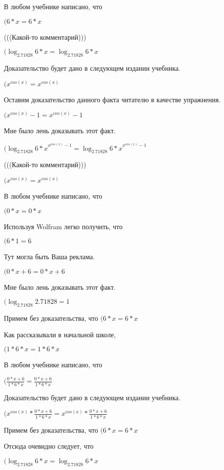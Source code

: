 \documentclass[12pt,a4paper,fleqn]{article}
\theoremstyle{definition}
\begin{document}
В любом учебнике написано, что

$( 6  *  x  =  6  *  x $

(((Какой-то комментарий)))

$(\log_{ 2.71828 }{ 6  *  x } = \log_{ 2.71828 }{ 6  *  x }$

Доказательство будет дано в следующем издании учебника.

$({ x }^{cos( x )} = { x }^{cos( x )}$

Оставим доказательство данного факта читателю в качестве упражнения.

$({ x }^{cos( x )} -  1  = { x }^{cos( x )} -  1 $

Мне было лень доказывать этот факт.

$({\log_{ 2.71828 }{ 6  *  x }}^{{ x }^{cos( x )} -  1 } = {\log_{ 2.71828 }{ 6  *  x }}^{{ x }^{cos( x )} -  1 }$

(((Какой-то комментарий)))

$({ x }^{cos( x )} = { x }^{cos( x )}$

В любом учебнике написано, что

$( 0  *  x  =  0  *  x $

Используя Wolfram легко получить, что

$( 6  *  1  =  6 $

Тут могла быть Ваша реклама.

$( 0  *  x  +  6  =  0  *  x  +  6 $

Мне было лень доказывать этот факт.

$(\log_{ 2.71828 }{ 2.71828 } =  1 $

Примем без доказательства, что
$( 6  *  x  =  6  *  x $

Как рассказывали в начальной школе,

$( 1  *  6  *  x  =  1  *  6  *  x $

В любом учебнике написано, что

$(\frac{ 0  *  x  +  6 }{ 1  *  6  *  x }
 = \frac{ 0  *  x  +  6 }{ 1  *  6  *  x }
$

Доказательство будет дано в следующем издании учебника.

$({ x }^{cos( x )} * \frac{ 0  *  x  +  6 }{ 1  *  6  *  x }
 = { x }^{cos( x )} * \frac{ 0  *  x  +  6 }{ 1  *  6  *  x }
$

Примем без доказательства, что
$( 6  *  x  =  6  *  x $

Отсюда очевидно следует, что

$(\log_{ 2.71828 }{ 6  *  x } = \log_{ 2.71828 }{ 6  *  x }$
\end{document}
